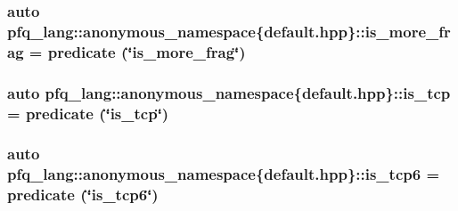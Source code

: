 \hypertarget{namespacepfq__lang_1_1anonymous__namespace_02default_8hpp_03_a2e8c6d9921b25eecb2a880f73f1beb3c}{
\subsubsection[{is\+\_\+more\+\_\+frag}]{\setlength{\rightskip}{0pt plus 5cm}auto pfq\+\_\+lang\+::anonymous\+\_\+namespace\{default.\+hpp\}\+::is\+\_\+more\+\_\+frag = {\bf predicate} (\char`\"{}is\+\_\+more\+\_\+frag\char`\"{})}}\label{namespacepfq__lang_1_1anonymous__namespace_02default_8hpp_03_a2e8c6d9921b25eecb2a880f73f1beb3c}
\hypertarget{namespacepfq__lang_1_1anonymous__namespace_02default_8hpp_03_a219c50fd572a25336a32e00cf527c565}{
\subsubsection[{is\+\_\+tcp}]{\setlength{\rightskip}{0pt plus 5cm}auto pfq\+\_\+lang\+::anonymous\+\_\+namespace\{default.\+hpp\}\+::is\+\_\+tcp = {\bf predicate} (\char`\"{}is\+\_\+tcp\char`\"{})}}\label{namespacepfq__lang_1_1anonymous__namespace_02default_8hpp_03_a219c50fd572a25336a32e00cf527c565}
\hypertarget{namespacepfq__lang_1_1anonymous__namespace_02default_8hpp_03_a096d3a0faa81e83be5cfeb025526275d}{
\subsubsection[{is\+\_\+tcp6}]{\setlength{\rightskip}{0pt plus 5cm}auto pfq\+\_\+lang\+::anonymous\+\_\+namespace\{default.\+hpp\}\+::is\+\_\+tcp6 = {\bf predicate} (\char`\"{}is\+\_\+tcp6\char`\"{})}}\label{namespacepfq__lang_1_1anonymous__namespace_02default_8hpp_03_a096d3a0faa81e83be5cfeb025526275d}
